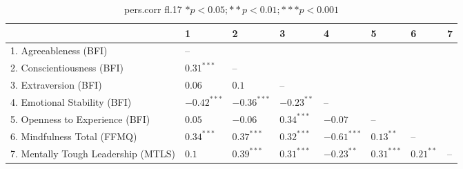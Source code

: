 \begin{table}[ht]
\centering
\begin{tabular}{llllllll}
  \hline
 & 1 & 2 & 3 & 4 & 5 & 6 & 7 \\ 
  \hline
1. Agreeableness (BFI) & -- &  &  &  &  &  &  \\ 
  2. Conscientiousness (BFI) & $0.31^{***}$ & -- &  &  &  &  &  \\ 
  3. Extraversion (BFI) & $0.06$ & $0.1$ & -- &  &  &  &  \\ 
  4. Emotional Stability (BFI) & $-0.42^{***}$ & $-0.36^{***}$ & $-0.23^{**}$ & -- &  &  &  \\ 
  5. Openness to Experience (BFI) & $0.05$ & $-0.06$ & $0.34^{***}$ & $-0.07$ & -- &  &  \\ 
  6. Mindfulness Total (FFMQ) & $0.34^{***}$ & $0.37^{***}$ & $0.32^{***}$ & $-0.61^{***}$ & $0.13^{**}$ & -- &  \\ 
  7. Mentally Tough Leadership (MTLS) & $0.1$ & $0.39^{***}$ & $0.31^{***}$ & $-0.23^{**}$ & $0.31^{***}$ & $0.21^{**}$ & -- \\ 
   \hline
\end{tabular}
\caption{pers.corr fl.17 $* p < 0.05; ** p < 0.01; *** p < 0.001$} 
\label{freq_corr.pers.corr.fl.17}
\end{table}

